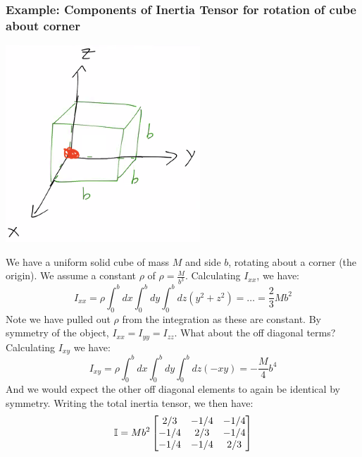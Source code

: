 \subsubsection{Example: Components of Inertia Tensor for rotation of cube about corner}
\begin{center}
    \includegraphics[scale=1]{Lecture-18/l18-img3.png}
\end{center}
We have a uniform solid cube of mass $M$ and side $b$, rotating about a corner (the origin). We assume a constant $\rho$ of $\rho = \frac{M}{b^3}$. Calculating $I_{xx}$, we have:
\[I_{xx} = \rho\int_0^bdx \int_0^bdy \int_0^bdz (y^2 + z^2) = \ldots = \frac{2}{3}Mb^2\]
Note we have pulled out $\rho$ from the integration as these are constant. By symmetry of the object, $I_{xx} = I_{yy} = I_{zz}$. What about the off diagonal terms? Calculating $I_{xy}$ we have:
\[I_{xy} = \rho\int_0^bdx\int_0^bdy\int_0^bdz(-xy) = -\frac{M}{4}b^4\]
And we would expect the other off diagonal elements to again be identical by symmetry. Writing the total inertia tensor, we then have:
\[\mathbb{I} = Mb^2\begin{bmatrix}2/3 & -1/4 & -1/4 \\ -1/4 & 2/3 & -1/4 \\ -1/4 & -1/4 & 2/3\end{bmatrix}\]

